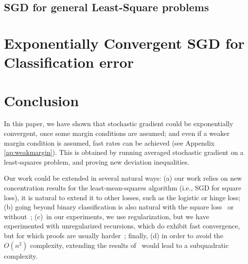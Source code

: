 \documentclass[final]{colt2018} %
\begin{document}
\subsection{SGD for general Least-Square problems}





\section{Exponentially Convergent SGD for Classification error}
\label{sec:expo}







% 



\section{Conclusion}
\label{sec:conc}

In this paper, we have shown that stochastic gradient could be exponentially convergent, once some margin conditions are assumed; and even if a weaker margin condition is assumed, fast rates can be achieved (see Appendix \ref{ap:weakmargin}). This is obtained by running averaged stochastic gradient on a least-squares problem, and proving new deviation inequalities.

Our work could be extended in several natural ways: (a) our work relies on new concentration results for the least-mean-squares algorithm (i.e., SGD for square loss), it is natural to extend it to other losses, such as the logistic or hinge loss; (b) going beyond binary classification is also natural with the square loss~\citep{ciliberto2016consistent,NIPS2017_6634} or without~\citep{taskar2005learning}; (c)~in our experiments, we use regularization, but we have experimented with unregularized recursions, which do exhibit fast convergence, but for which proofs are usually harder~\citep{dieuleveut2016nonparametric}; finally, (d) in order to avoid the $O(n^2)$ complexity, extending the results of~\citet{rudi2017falkon,rudi2017generalization} would lead to a subquadratic complexity.








\appendix


\end{document}
